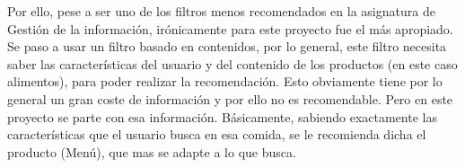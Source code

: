 Por ello, pese a ser uno de los filtros menos recomendados en la asignatura de Gestión de la información, irónicamente para este proyecto fue el más apropiado. Se paso a usar un filtro basado en contenidos, por lo general, este filtro necesita saber las características del usuario y del contenido de los productos (en este caso alimentos), para poder realizar la recomendación. Esto obviamente tiene por lo general un gran coste de información y por ello no es recomendable. Pero en este proyecto se parte con esa información. Básicamente, sabiendo exactamente las características que el usuario busca en esa comida, se le recomienda dicha el producto (Menú), que mas se adapte a lo que busca.


